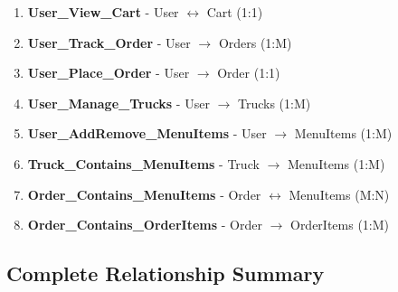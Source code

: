 \documentclass[11pt]{article}
\begin{document}
\begin{tcolorbox}[colback=lightgray, colframe=accentorange, boxrule=1pt, arc=2mm, left=3mm]
\begin{enumerate}[leftmargin=1cm]
    \item \textbf{User\_View\_Cart} - User $\leftrightarrow$ Cart (1:1)
    \item \textbf{User\_Track\_Order} - User $\rightarrow$ Orders (1:M)
    \item \textbf{User\_Place\_Order} - User $\rightarrow$ Order (1:1)
    \item \textbf{User\_Manage\_Trucks} - User $\rightarrow$ Trucks (1:M)
    \item \textbf{User\_AddRemove\_MenuItems} - User $\rightarrow$ MenuItems (1:M)
    \item \textbf{Truck\_Contains\_MenuItems} - Truck $\rightarrow$ MenuItems (1:M)
    \item \textbf{Order\_Contains\_MenuItems} - Order $\leftrightarrow$ MenuItems (M:N)
    \item \textbf{Order\_Contains\_OrderItems} - Order $\rightarrow$ OrderItems (1:M)
\end{enumerate}
\end{tcolorbox}

\vspace{0.5cm}

\subsection{Complete Relationship Summary}
\end{document}
